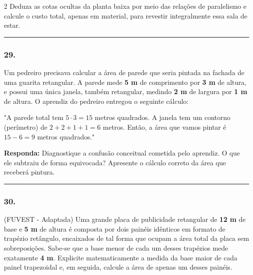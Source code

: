 \documentclass[twoside, 10pt, a4paper]{article}
\newlength{\espacoPreQuestao}\setlength{\espacoPreQuestao}{0.1cm}
\newlength{\espacoQuestao}\setlength{\espacoQuestao}{0.2cm}
\begin{document}
\begin{multicols*}{2}
Deduza as cotas ocultas da planta baixa por meio das relações de paralelismo e calcule o custo total, apenas em material, para revestir integralmente essa sala de estar.
\par\vspace{\espacoQuestao}

\noindent\textcolor{CorLinha}{\rule{\linewidth}{0.5pt}} 
\par\vspace{\espacoPreQuestao}
\subsubsection*{29.} Um pedreiro precisava calcular a área de parede que seria pintada na fachada de uma guarita retangular. A parede mede \textbf{5 m} de comprimento por \textbf{3 m} de altura, e possui uma única janela, também retangular, medindo \textbf{2 m} de largura por \textbf{1 m} de altura. O aprendiz do pedreiro entregou o seguinte cálculo:
\par
"A parede total tem $ 5 \cdot 3 = 15 $ metros quadrados. A janela tem um contorno (perímetro) de $ 2+2+1+1 = 6 $ metros. Então, a área que vamos pintar é $ 15 - 6 = 9 $ metros quadrados."
\begin{boxresponda}
\textbf{Responda:} Diagnostique a confusão conceitual cometida pelo aprendiz. O que ele subtraiu de forma equivocada? Apresente o cálculo correto da área que receberá pintura.
\end{boxresponda}
\par\vspace{\espacoQuestao}

\noindent\textcolor{CorLinha}{\rule{\linewidth}{0.5pt}} 
\par\vspace{\espacoPreQuestao}
\subsubsection*{30.} (FUVEST - Adaptada) Uma grande placa de publicidade retangular de \textbf{12 m} de base e \textbf{5 m} de altura é composta por dois painéis idênticos em formato de trapézio retângulo, encaixados de tal forma que ocupam a área total da placa sem sobreposições. Sabe-se que a base menor de cada um desses trapézios mede exatamente \textbf{4 m}. Explicite matematicamente a medida da base maior de cada painel trapezoidal e, em seguida, calcule a área de apenas um desses painéis.
\par\vspace{\espacoQuestao}

\end{multicols*}
\end{document}
